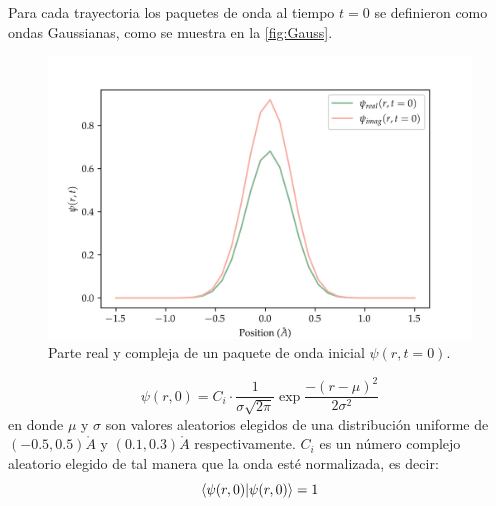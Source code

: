 Para cada trayectoria los paquetes de onda al tiempo $t=0$ se definieron como ondas Gaussianas, como se muestra en la \autoref{fig:Gauss}.
\begin{figure}[H]
  \centering
  \includegraphics[width=1\textwidth]{./img/DataWave.png}
  \caption{Parte real y compleja de un paquete de onda inicial $\psi(r,t=0)$.}
  \label{fig:Gauss}
\end{figure}

\begin{equation}
  \label{eq:gaussian}
  \psi(r,0) = C_i\cdot \frac{1}{\sigma\sqrt{2\pi}}\exp{\frac{-(r-\mu)^2}{2\sigma^2}}
\end{equation}
en donde $\mu$ y $\sigma$ son valores aleatorios elegidos de una distribución uniforme de $(-0.5,0.5)\mathring{A}$ y $(0.1,0.3)\mathring{A}$ respectivamente. $C_i$ es un número complejo aleatorio elegido de tal manera que la onda esté normalizada, es decir:
$$\bra{\psi(r,0)}\ket{\psi(r,0)} = 1$$

